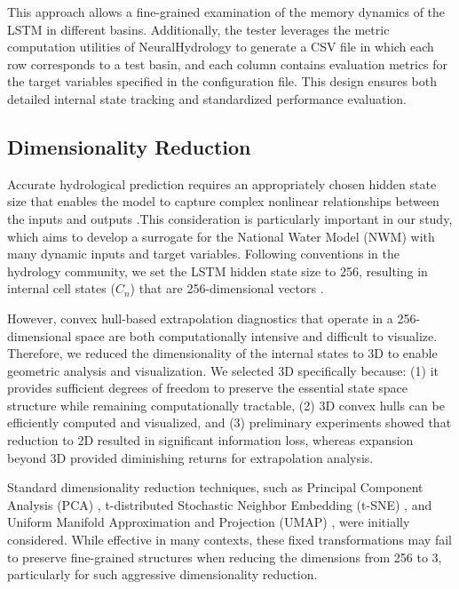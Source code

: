\documentclass{article}
\begin{document}
This approach allows a fine-grained examination of the memory dynamics of the LSTM in different basins. Additionally, the tester leverages the metric computation utilities of NeuralHydrology to generate a CSV file in which each row corresponds to a test basin, and each column contains evaluation metrics for the target variables specified in the configuration file. This design ensures both detailed internal state tracking and standardized performance evaluation.

\subsection{Dimensionality Reduction}

Accurate hydrological prediction requires an appropriately chosen hidden state size that enables the model to capture complex nonlinear relationships between the inputs and outputs \cite{Kratzert2024}.This consideration is particularly important in our study, which aims to develop a surrogate for the National Water Model (NWM) with many dynamic inputs and target variables. Following conventions in the hydrology community, we set the LSTM hidden state size to 256, resulting in internal cell states ($C_n$) that are 256-dimensional vectors \cite{Kratzert2024}.

However, convex hull-based extrapolation diagnostics that operate in a 256-dimensional space are both computationally intensive and difficult to visualize. Therefore, we reduced the dimensionality of the internal states to 3D to enable geometric analysis and visualization. We selected 3D specifically because: (1) it provides sufficient degrees of freedom to preserve the essential state space structure while remaining computationally tractable, (2) 3D convex hulls can be efficiently computed and visualized, and (3) preliminary experiments showed that reduction to 2D resulted in significant information loss, whereas expansion beyond 3D provided diminishing returns for extrapolation analysis.

Standard dimensionality reduction techniques, such as Principal Component Analysis (PCA) \cite{Wold1987PCA}, t-distributed Stochastic Neighbor Embedding (t-SNE) \cite{Cai2021tSNE}, and Uniform Manifold Approximation and Projection (UMAP) \cite{McInnes2018UMAP}, were initially considered. While effective in many contexts, these fixed transformations may fail to preserve fine-grained structures when reducing the dimensions from 256 to 3, particularly for such aggressive dimensionality reduction.
\end{document}
